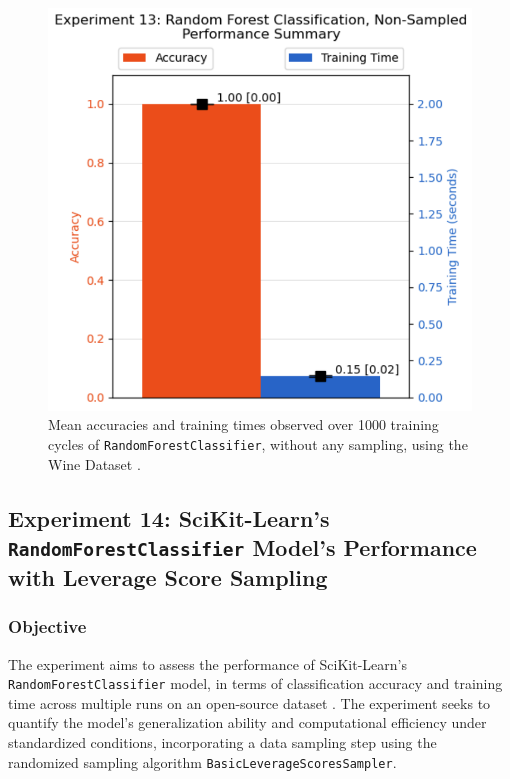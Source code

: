 \documentclass{article}
\theoremstyle{plain}
\theoremstyle{definition}
\theoremstyle{remark}
\begin{document}
\begin{figure}[ht]
	\vskip 0.2in
	\begin{center}
		\centerline{\includegraphics[width=\columnwidth]{experiment_13}}
		\caption{Mean accuracies and training times observed over 1000 training cycles of \texttt{RandomForestClassifier}, without any sampling, using the Wine Dataset \cite{wine}.}
		\label{experiment_13}
	\end{center}
	\vskip -0.2in
\end{figure}


\subsection{Experiment 14: SciKit-Learn's \texttt{RandomForestClassifier} Model's Performance with Leverage Score Sampling}

\subsubsection{Objective}

The experiment aims to assess the performance of SciKit-Learn's \texttt{RandomForestClassifier} model, in terms of classification accuracy and training time across multiple runs on an open-source dataset \cite{wine}. The experiment seeks to quantify the model's generalization ability and computational efficiency under standardized conditions, incorporating a data sampling step using the randomized sampling algorithm \texttt{BasicLeverageScoresSampler}.
\end{document}
